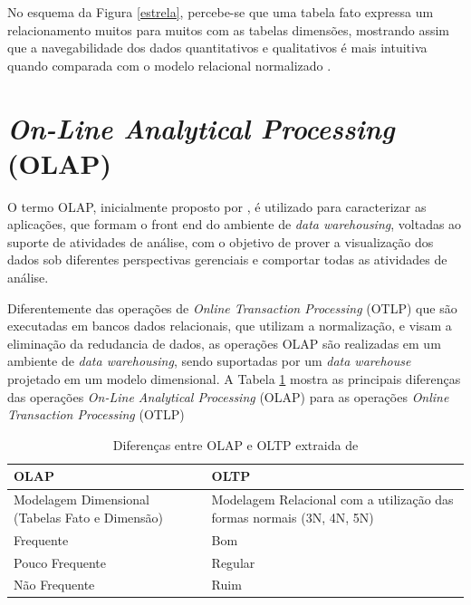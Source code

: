 No esquema da Figura \ref{estrela}, percebe-se que uma tabela fato expressa um relacionamento muitos para muitos com as tabelas dimensões, mostrando assim que a navegabilidade dos dados quantitativos e qualitativos é mais intuitiva quando comparada com o modelo relacional normalizado \cite{Kimball2002}. 


\section{\textit{On-Line Analytical Processing} (OLAP)}

O termo OLAP, inicialmente proposto por , é utilizado para caracterizar as aplicações, que formam o front end do ambiente de \textit{data warehousing}, voltadas ao suporte de atividades de análise, com o objetivo de prover a visualização dos dados sob diferentes perspectivas gerenciais e comportar todas as atividades de análise.


Diferentemente das operações de \textit{Online Transaction Processing} (OTLP) que são executadas em bancos dados relacionais, que utilizam a normalização, e visam a eliminação da redudancia de dados,  as operações OLAP são realizadas em um ambiente de \textit{data warehousing}, sendo suportadas por um \textit{data warehouse} projetado em um modelo dimensional. A Tabela \ref{olapxoltp} mostra as principais diferenças das operações \textit{On-Line Analytical Processing} (OLAP) para as operações \textit{Online Transaction Processing} (OTLP)

	\begin{table}[!ht]
	\begin{center}
	 \begin{tabular}{|l|l|}
		\hline
		OLAP & OLTP \\ \hline
		Modelagem Dimensional (Tabelas Fato e Dimensão) & Modelagem Relacional com a utilização das formas normais (3N, 4N, 5N) \\ \hline
		Frequente       & Bom       \\ \hline
		Pouco Frequente & Regular   \\ \hline
		Não Frequente   & Ruim      \\ \hline
		\end{tabular}
		\caption{Diferenças entre OLAP e OLTP extraida de }
		\label{olapxoltp}
		\end{center}
		\end{table}












